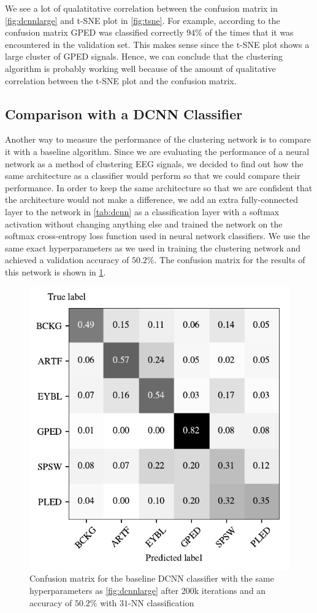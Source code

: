 We see a lot of qualatitative correlation between the confusion matrix in \cref{fig:dcnnlarge} and t-SNE plot in \cref{fig:tsne}. For example, according to the confusion matrix GPED was classified correctly $94\%$ of the times that it was encountered in the validation set. This makes sense since the t-SNE plot shows a large cluster of GPED signals. Hence, we can conclude that the clustering algorithm is probably working well because of the amount of qualitative correlation between the t-SNE plot and the confusion matrix.


\subsection{Comparison with a DCNN Classifier}
Another way to measure the performance of the clustering network is to compare it with a baseline algorithm. Since we are evaluating the performance of a neural network as a method of clustering EEG signals, we decided to find out how the same architecture as a classifier would perform so that we could compare their performance. In order to keep the same architecture so that we are confident that the architecture would not make a difference, we add an extra fully-connected layer to the network in \cref{tab:dcnn} as a classification layer with a softmax activation without changing anything else and trained the network on the softmax cross-entropy loss function used in neural network classifiers. We use the same exact hyperparameters as we used in training the clustering network and achieved a validation accuracy of $50.2\%$. The confusion matrix for the results of this network is shown in \cref{fig:dcnnclasslarge}. 

\begin{figure}[!ht]
	\centering
	\includegraphics[width=0.55\linewidth]{pictures/conf_mat_baseline.pdf}
	\caption[Confusion matrix for the baseline DCNN classifier]{Confusion matrix for the baseline DCNN classifier with the same hyperparameters as \cref{fig:dcnnlarge} after 200k iterations and an accuracy of $50.2\%$ with $31$-NN classification}\label{fig:dcnnclasslarge}  
\end{figure}

